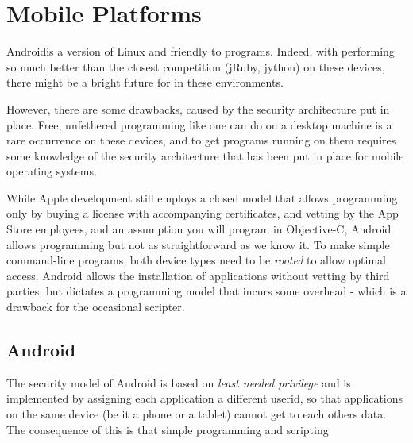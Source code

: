 {{\section{Mobile Platforms}
Android\texttrademark is a version of Linux and friendly to \nr{}
programs. Indeed, with \nr{} performing so much better than the closest
competition (jRuby, jython) on these devices, there might be a bright
future for \nr{} in these environments. 

However, there are some drawbacks, caused by the security architecture
put in place. Free, unfethered programming like one can do on a
desktop machine is a rare occurrence on these devices, and to get
programs running on them requires some knowledge of the security
architecture that has been put in place for mobile operating systems.

While Apple development still employs a closed model that allows programming only by
buying a license with accompanying certificates, and vetting by the
App Store employees, and an assumption you will program in
Objective-C, Android allows programming but not as straightforward as
we know it. To make simple command-line \nr{} programs, both device
types need to be \emph{rooted} to allow optimal access. Android allows
the installation of applications without vetting by third parties, but
dictates a programming model that incurs some overhead - which is a
drawback for the occasional scripter.
\subsection{Android}
The security model of Android is based on \emph{least needed
  privilege} and is implemented by assigning each application a
different userid, so that applications on the same device (be it a
phone or a tablet) cannot get to each others data. The consequence of
this is that simple \nr{} programming and scripting 
}}
